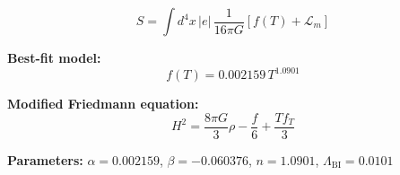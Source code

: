 
\begin{equation}
  S = \int d^4x \, |e| \, \frac{1}{16\pi G} \left[ f(T) + \mathcal{L}_m \right]
\end{equation}

\textbf{Best-fit model:}
\begin{equation}
  f(T) = 0.002159 \, T^{1.0901}
\end{equation}

\textbf{Modified Friedmann equation:}
\begin{equation}
  H^2 = \frac{8\pi G}{3} \rho - \frac{f}{6} + \frac{T f_T}{3}
\end{equation}

\textbf{Parameters:}
$\alpha = 0.002159$, \quad
$\beta = -0.060376$, \quad
$n = 1.0901$, \quad
$\Lambda_{\text{BI}} = 0.0101$